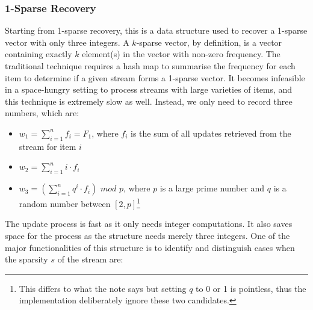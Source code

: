 \documentclass[a4paper, 11pt]{article}
\begin{document}
            \subsubsection{1-Sparse Recovery}
                Starting from 1-sparse recovery, this is a data structure used to recover a 1-sparse vector with only three integers. A $k$-sparse vector, by definition, is a vector containing exactly $k$ element(s) in the vector with non-zero frequency. The traditional technique requires a hash map to summarise the frequency for each item to determine if a given stream forms a 1-sparse vector. It becomes infeasible in a space-hungry setting to process streams with large varieties of items, and this technique is extremely slow as well. Instead, we only need to record three numbers, which are:
                \begin{itemize}
                    \item $w_{1} = \sum^{n}_{i = 1} f_{i} = F_{1}$, where $f_{i}$ is the sum of all updates retrieved from the stream for item $i$
                    \item $w_{2} = \sum^{n}_{i = 1} i \cdot f_{i}$
                    \item $w_{3} = \left( \sum^{n}_{i = 1} q^{i} \cdot f_{i} \right) \textit{ mod } p$, where $p$ is a large prime number and $q$ is a random number between $\left[ 2,p \right]$\footnote{This differs to what the note says but setting $q$ to 0 or 1 is pointless, thus the implementation deliberately ignore these two candidates.}
                \end{itemize}
                The update process is fast as it only needs integer computations. It also saves space for the process as the structure needs merely three integers. One of the major functionalities of this structure is to identify and distinguish cases when the sparsity $s$ of the stream are:
\end{document}
